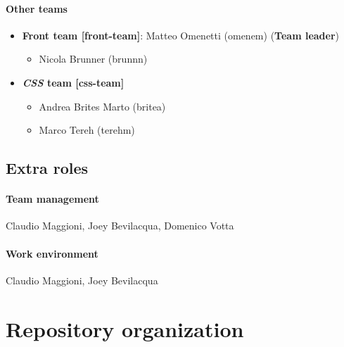 \documentclass[hidelinks,12pt,a4paper,numbers=enddot]{scrartcl}
\begin{document}
\paragraph{Other teams}
\begin{itemize}
    \item \textbf{Front team {[}front-team{]}}: Matteo Omenetti (omenem) (\textbf{Team leader})
    \begin{itemize}
    \item Nicola Brunner (brunnn)
    \end{itemize}
    \item \textbf{\emph{CSS} team {[}css-team{]}}
    \begin{itemize}
    \item Andrea Brites Marto (britea)
    \item Marco Tereh (terehm)
    \end{itemize}
\end{itemize}

\subsection{Extra roles}

\paragraph{Team management}
Claudio Maggioni, Joey Bevilacqua, Domenico Votta

\paragraph{Work environment}
Claudio Maggioni, Joey Bevilacqua

\newpage

\section{Repository organization}\label{repository-organization}
\end{document}
